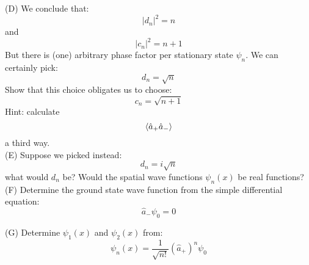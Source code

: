 \documentclass[12pt]{article}
\begin{document}
\newpage


\noindent
(D) We conclude that:
$$|d_n|^2 = n$$
and
$$|c_n|^2 = n+1$$
But there is (one) arbitrary phase factor per stationary state $\psi_n$.  We can certainly pick:
$$d_n = \sqrt{n}$$
Show that this choice obligates us to choose:
$$c_n = \sqrt{n+1}$$
Hint: calculate $$\braket{\hat{a}_+\hat{a}_-}$$ a third way.\\[5pt]

\noindent
(E) Suppose we picked instead:
$$d_n = i\sqrt{n}$$
what would $d_n$ be?  Would the spatial wave functions $\psi_n(x)$ be real functions?\\[5pt]

\noindent
(F) Determine the ground state wave function from the simple differential equation:
$$\hat{a}_- \psi_0 = 0$$

\noindent
(G) Determine $\psi_1(x)$ and $\psi_2(x)$ from:
$$\psi_n(x) = \frac{1}{\sqrt{n!}}(\hat{a}_+)^n \psi_0$$
\end{document}
